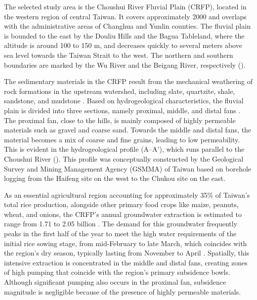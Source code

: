 
The selected study area is the Choushui River Fluvial Plain (CRFP), located in the western region of central Taiwan. It covers approximately 2000  and overlaps with the administrative areas of Changhua and Yunlin counties. The fluvial plain is bounded to the east by the Douliu Hills and the Bagua Tableland, where the altitude is around 100 to 150 m, and decreases quickly to several meters above sea level towards the Taiwan Strait to the west. The northern and southern boundaries are marked by the Wu River and the Beigang River, respectively ().

The sedimentary materials in the CRFP result from the mechanical weathering of rock formations in the upstream watershed, including slate, quartzite, shale, sandstone, and mudstone \citep{RN17, RN47}. Based on hydrogeological characteristics, the fluvial plain is divided into three sections, namely proximal, middle, and distal fans \citep{RN46}. The proximal fan, close to the hills, is mainly composed of highly permeable materials such as gravel and coarse sand. Towards the middle and distal fans, the material becomes a mix of coarse and fine grains, leading to low permeability. This is evident in the hydrogeological profile ($\text{A--A'}$), which runs parallel to the Choushui River (). This profile was conceptually constructed by the Geological Survey and Mining Management Agency (GSMMA) of Taiwan based on borehole logging from the Haifeng site on the west to the Chukou site on the east.

As an essential agricultural region accounting for approximately 35\% of Taiwan's total rice production, alongside other primary food crops like maize, peanuts, wheat, and onions, the CRFP's annual groundwater extraction is estimated to range from 1.71 to 2.05 billion  \citep{craf_pumping}. The demand for this groundwater frequently peaks in the first half of the year to meet the high water requirements of the initial rice sowing stage, from mid-February to late March, which coincides with the region's dry season, typically lasting from November to April \citep{RN64}. Spatially, this intensive extraction is concentrated in the middle and distal fans, creating zones of high pumping that coincide with the region's primary subsidence bowls. Although significant pumping also occurs in the proximal fan, subsidence magnitude is negligible because of the presence of highly permeable materials.


